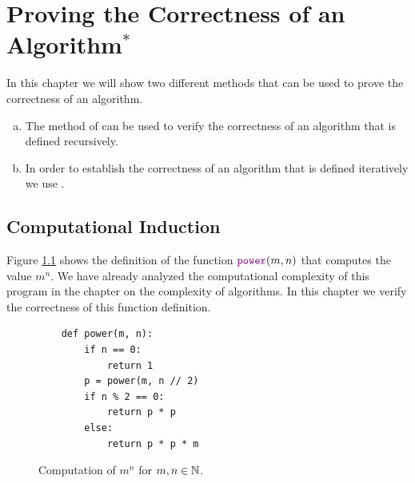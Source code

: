 \chapter{Proving the Correctness of an Algorithm$^*$}
In this chapter we will show two different methods that can be used to prove the correctness of an algorithm.
\begin{enumerate}[(a)]
\item The method of  can be used to verify the correctness of an algorithm that
      is defined recursively.
\item In order to establish the correctness of an algorithm that is defined iteratively we use . 
\end{enumerate}

\section{Computational Induction}
Figure \ref{fig:power.py} shows the definition of the function $\mytt{power}(m,n)$ that computes
the value $m^n$.  We have already analyzed the computational complexity of this program in the chapter on the complexity of
algorithms.
In this chapter we  verify the correctness of this function definition.

\begin{figure}[!h]
  \centering
\begin{verbatim}
    def power(m, n):
        if n == 0:
            return 1
        p = power(m, n // 2)
        if n % 2 == 0:
            return p * p
        else:
            return p * p * m
\end{verbatim}
\vspace*{-0.3cm}
  \caption{Computation of $m^n$ for $m,n \in {\mathbb N}$.}
  \label{fig:power.py}
\end{figure} 

